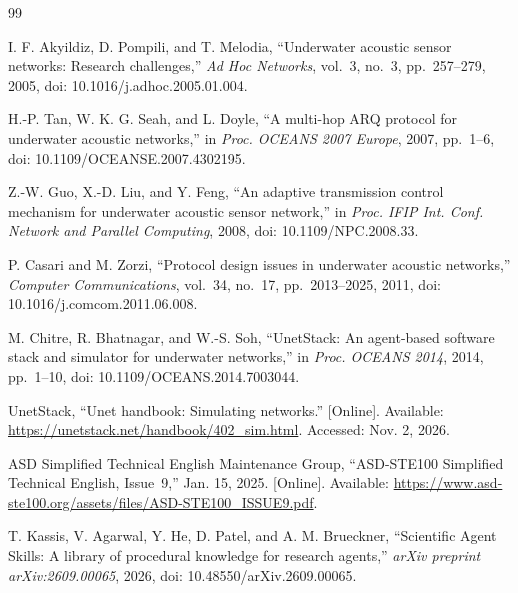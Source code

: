 \documentclass[11pt]{article}
\begin{document}
\begin{thebibliography}{99}
\small

I. F. Akyildiz, D. Pompili, and T. Melodia, ``Underwater acoustic sensor networks: Research challenges,'' \emph{Ad Hoc Networks}, vol.~3, no.~3, pp.~257--279, 2005, doi: 10.1016/j.adhoc.2005.01.004.

H.-P. Tan, W. K. G. Seah, and L. Doyle, ``A multi-hop ARQ protocol for underwater acoustic networks,'' in \emph{Proc. OCEANS 2007 Europe}, 2007, pp.~1--6, doi: 10.1109/OCEANSE.2007.4302195.

Z.-W. Guo, X.-D. Liu, and Y. Feng, ``An adaptive transmission control mechanism for underwater acoustic sensor network,'' in \emph{Proc. IFIP Int. Conf. Network and Parallel Computing}, 2008, doi: 10.1109/NPC.2008.33.

P. Casari and M. Zorzi, ``Protocol design issues in underwater acoustic networks,'' \emph{Computer Communications}, vol.~34, no.~17, pp.~2013--2025, 2011, doi: 10.1016/j.comcom.2011.06.008.

M. Chitre, R. Bhatnagar, and W.-S. Soh, ``UnetStack: An agent-based software stack and simulator for underwater networks,'' in \emph{Proc. OCEANS 2014}, 2014, pp.~1--10, doi: 10.1109/OCEANS.2014.7003044.

UnetStack, ``Unet handbook: Simulating networks.'' [Online]. Available: \url{https://unetstack.net/handbook/402_sim.html}. Accessed: Nov. 2, 2026.

ASD Simplified Technical English Maintenance Group, ``ASD-STE100 Simplified Technical English, Issue~9,'' Jan. 15, 2025. [Online]. Available: \url{https://www.asd-ste100.org/assets/files/ASD-STE100_ISSUE9.pdf}.

T. Kassis, V. Agarwal, Y. He, D. Patel, and A. M. Brueckner, ``Scientific Agent Skills: A library of procedural knowledge for research agents,'' \emph{arXiv preprint arXiv:2609.00065}, 2026, doi: 10.48550/arXiv.2609.00065.

\end{thebibliography}
\end{document}
